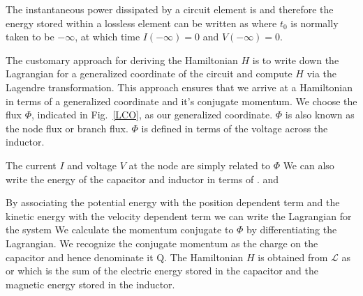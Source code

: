 The instantaneous power dissipated by a circuit element is
and therefore the energy stored within a lossless element can be written as
where $t_0$ is normally taken to be $- \infty$, at which time $I(- \infty)=0$ and $V(- \infty)=0$.

The customary approach for deriving the Hamiltonian $H$ is to write down the Lagrangian for a generalized coordinate of the circuit and compute $H$ via the Lagendre transformation.
This approach ensures that we arrive at a Hamiltonian in terms of a generalized coordinate and it's conjugate momentum.
We choose the flux $\Phi$, indicated in Fig.~\ref{LCO}, as our generalized coordinate.  $\Phi$ is also known as the node flux or branch flux.  $\Phi$ is defined in terms of the voltage across the inductor.

\noindent
The current $I$ and voltage $V$ at the node are simply related to $\Phi$
We can also write the energy of the capacitor and inductor in terms of \Phi.
and

\noindent
By associating the potential energy with the position dependent term and the kinetic energy with the velocity dependent term we can write the Lagrangian for the system
We calculate the momentum conjugate to $\Phi$ by differentiating the Lagrangian.
We recognize the conjugate momentum as the charge on the capacitor and hence denominate it Q.
The Hamiltonian $H$ is obtained from $\mathcal{L}$ as
or
which is the sum of the electric energy stored in the capacitor and the magnetic energy stored in the inductor.

